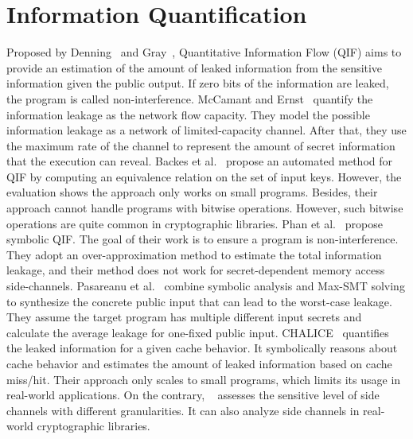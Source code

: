 \section{Information Quantification}
Proposed by Denning~\cite{robling1982cryptography} and Gray~\cite{gray1992toward},
Quantitative Information Flow (QIF) aims to provide an estimation of the amount of leaked information from the sensitive information given the public output. If zero bits
of the information are leaked, the program is called non-interference. 
McCamant and Ernst~\cite{McCamantE2008} quantify the information leakage as the network
flow capacity. They model the possible information leakage as a network of limited-capacity
channel. After that, they use the maximum rate of the channel to represent the amount of secret information that the execution can reveal.
Backes et al.~\cite{5207642} propose an automated method for QIF
by computing an equivalence relation on the set of input keys. However,
the evaluation shows the approach only works on small programs.
Besides, their approach cannot handle programs with bitwise operations.
However, such bitwise operations are quite common in cryptographic libraries.
Phan et al.~\cite{Phan:2012:SQI:2382756.2382791} propose symbolic QIF. The goal of their
work is to ensure a program is non-interference. They adopt an over-approximation method to estimate the total information leakage, and their method
does not work for secret-dependent memory access side-channels.
Pasareanu et al.~\cite{pasareanu2016multi} combine symbolic analysis and Max-SMT solving to synthesize the concrete public input that can lead to the worst-case leakage. They assume the target program has multiple different input secrets and calculate the average leakage for one-fixed public input.
CHALICE~\cite{Chattopadhyay:2017:QIL:3127041.3127044} quantifies the leaked
information for a given cache behavior.
It symbolically reasons about cache
behavior and estimates the amount of leaked information based on cache miss/hit.
Their approach only scales to small programs, which limits its usage in
real-world applications. On the contrary, \tool{}~\cite{bao2021abacus} assesses the sensitive level
of side channels with different granularities. It can also analyze side channels in real-world cryptographic libraries.

